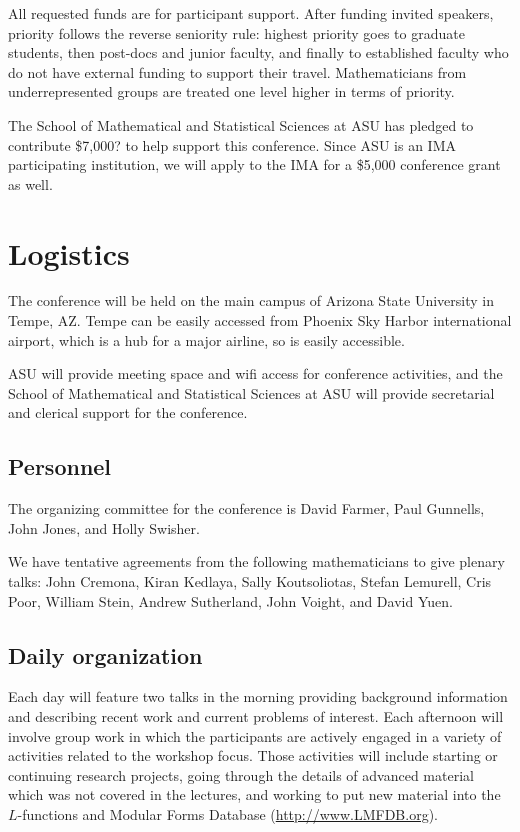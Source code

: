 \documentclass[amstex,11pt]{amsart}
\numberwithin{equation}{section}
\begin{document}
All requested funds are for participant support.  After funding invited
speakers, priority 
follows the reverse seniority rule: highest priority goes to graduate
students, then post-docs and junior faculty, and finally to established
faculty who do not have external funding to support their travel.
Mathematicians from underrepresented groups are treated one level
higher in terms of priority.

The School of Mathematical and Statistical Sciences at ASU has pledged to
contribute \$7,000?  to help support this conference.
Since ASU is an IMA participating institution, we will apply to the
IMA for a \$5,000 conference grant as well.

\section{Logistics}

The conference will be held on the main campus of Arizona State
University in Tempe, AZ.  Tempe can be easily accessed from Phoenix
Sky Harbor international airport, which is a hub for a major airline,
so is easily accessible.

ASU will provide meeting space and wifi access for conference
activities, and the School of Mathematical and Statistical Sciences at
ASU will provide secretarial and clerical support for the conference.

\subsection{Personnel}

The organizing committee for the conference is David
Farmer, Paul Gunnells, 
John Jones, and Holly Swisher.

We have tentative agreements from the following mathematicians to give
plenary talks:
John Cremona, Kiran Kedlaya, Sally Koutsoliotas, Stefan Lemurell, 
Cris Poor, William Stein, Andrew Sutherland, John Voight, and David Yuen.

\subsection{Daily organization}


Each day will feature two talks in the morning providing background
information and describing recent work and current problems of
interest.  Each afternoon will involve group work in which the
participants are actively engaged in a variety of activities related
to the workshop focus.  Those activities will include starting or
continuing research projects, going through the details of advanced
material which was not covered in the lectures, and working to put new
material into the $L$-functions and Modular Forms Database
(\url{http://www.LMFDB.org}).
\end{document}
